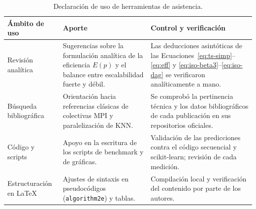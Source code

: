 \documentclass[11pt,a4paper]{article}
\begin{document}
\begin{table}[H]
\centering
\caption{Declaración de uso de herramientas de asistencia.}
\label{tab:llm}
\small
\begin{tabularx}{\textwidth}{>{\raggedright\arraybackslash}p{3cm}>{\raggedright\arraybackslash}X>{\raggedright\arraybackslash}X}
\toprule
\textbf{Ámbito de uso} & \textbf{Aporte} & \textbf{Control y verificación}\\
\midrule
Revisión analítica & Sugerencias sobre la formulación analítica de la eficiencia $E(p)$ y el
  balance entre escalabilidad fuerte y débil. & Las deducciones asintóticas de las
  Ecuaciones~\eqref{eq:ts-simp}--\eqref{eq:eff} y \eqref{eq:iso-beta3}--\eqref{eq:iso-dag} se
  verificaron analíticamente a mano.\\
Búsqueda bibliográfica & Orientación hacia referencias clásicas de colectivas MPI y paralelización
  de KNN. & Se comprobó la pertinencia técnica y los datos bibliográficos de cada publicación en
  sus repositorios oficiales.\\
Código y scripts & Apoyo en la escritura de los scripts de benchmark y de gráficas. & Validación de
  las predicciones contra el código secuencial y scikit-learn; revisión de cada medición.\\
Estructuración en \LaTeX & Ajustes de sintaxis en pseudocódigos (\texttt{algorithm2e}) y tablas. &
  Compilación local y verificación del contenido por parte de los autores.\\
\bottomrule
\end{tabularx}
\end{table}

\printbibliography[heading=bibintoc,title={Referencias}]
\end{document}
